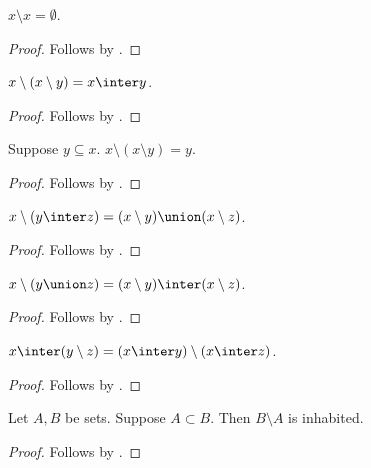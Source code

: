 \begin{proposition}\label{setminus_self}
    $x\setminus x = \emptyset$.
\end{proposition}
\begin{proof}
    Follows by .
\end{proof}

\begin{proposition}\label{setminus_setminus}
    $x\setminus (x\setminus y) = x\inter y$.
\end{proposition}
\begin{proof}
    Follows by .
\end{proof}

\begin{proposition}\label{double_relative_complement}
    Suppose $y\subseteq x$.
    $x\setminus (x\setminus y) = y$.
\end{proposition}
\begin{proof}
    Follows by .
\end{proof}

\begin{proposition}\label{setminus_inter}
    $x\setminus (y\inter z) = (x\setminus y)\union (x\setminus z)$.
\end{proposition}
\begin{proof}
    Follows by .
\end{proof}

\begin{proposition}\label{setminus_union}
    $x\setminus (y\union z) = (x\setminus y)\inter (x\setminus z)$.
\end{proposition}
\begin{proof}
    Follows by .
\end{proof}

\begin{proposition}\label{inter_setminus}
    $x\inter (y\setminus z) = (x\inter y)\setminus (x\inter z)$.
\end{proposition}
\begin{proof}
    Follows by .
\end{proof}

\begin{proposition}%
\label{difference_with_proper_subset_is_inhabited}
    Let $A, B$ be sets.
    Suppose $A\subset B$.
    Then $B\setminus A$ is inhabited.
\end{proposition}
\begin{proof}
    Follows by .
\end{proof}

